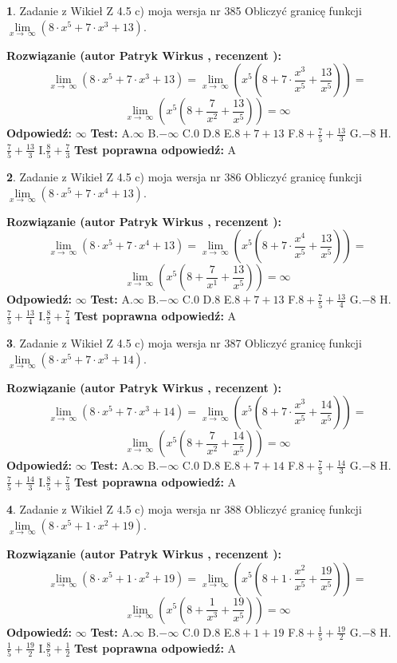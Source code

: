 \documentclass[12pt, a4paper]{article}
\theoremstyle{definition} %
\newtheorem{zad}{}
\newcommand{\zadStart}[1]{\begin{zad}#1\newline}
\newcommand{\zadStop}{\end{zad}}
\newcommand{\rozwStart}[2]{\noindent \textbf{Rozwiązanie (autor #1 , recenzent #2): }\newline}
\newcommand{\rozwStop}{\newline}
\newcommand{\odpStart}{\noindent \textbf{Odpowiedź:}\newline}
\newcommand{\odpStop}{\newline}
\newcommand{\testStart}{\noindent \textbf{Test:}\newline}
\newcommand{\testStop}{\newline}
\newcommand{\kluczStart}{\noindent \textbf{Test poprawna odpowiedź:}\newline}
\newcommand{\kluczStop}{\newline}
\begin{document}
\zadStart{Zadanie z Wikieł Z 4.5 c) moja wersja nr 385}
Obliczyć granicę funkcji  $\lim\limits_{x\to\ \infty}(8 \cdot x^{5}+7 \cdot x^{3}+13)$.
\zadStop
\rozwStart{Patryk Wirkus}{}
$$\lim\limits_{x\to\ \infty}(8 \cdot x^{5}+7 \cdot x^{3}+13) = \lim\limits_{x\to\ \infty}(x^{5}(8 +7 \cdot \frac{x^{3}}{x^{5}}+\frac{13}{x^{5}})) =$$ $$\lim\limits_{x\to\ \infty}(x^{5}(8 +\frac{7}{x^{2}}+\frac{13}{x^{5}})) =\infty$$
\rozwStop
\odpStart
$\infty$
\odpStop
\testStart
A.$\infty$ B.$-\infty$ C.$0$ D.$8$ E.$8 + 7 + 13$
F.$8+\frac{7}{5}+\frac{13}{3}$ G.$-8$
H.$\frac{7}{5}+\frac{13}{3}$
I.$\frac{8}{5}+\frac{7}{3}$
\testStop
\kluczStart
A
\kluczStop



\zadStart{Zadanie z Wikieł Z 4.5 c) moja wersja nr 386}
Obliczyć granicę funkcji  $\lim\limits_{x\to\ \infty}(8 \cdot x^{5}+7 \cdot x^{4}+13)$.
\zadStop
\rozwStart{Patryk Wirkus}{}
$$\lim\limits_{x\to\ \infty}(8 \cdot x^{5}+7 \cdot x^{4}+13) = \lim\limits_{x\to\ \infty}(x^{5}(8 +7 \cdot \frac{x^{4}}{x^{5}}+\frac{13}{x^{5}})) =$$ $$\lim\limits_{x\to\ \infty}(x^{5}(8 +\frac{7}{x^{1}}+\frac{13}{x^{5}})) =\infty$$
\rozwStop
\odpStart
$\infty$
\odpStop
\testStart
A.$\infty$ B.$-\infty$ C.$0$ D.$8$ E.$8 + 7 + 13$
F.$8+\frac{7}{5}+\frac{13}{4}$ G.$-8$
H.$\frac{7}{5}+\frac{13}{4}$
I.$\frac{8}{5}+\frac{7}{4}$
\testStop
\kluczStart
A
\kluczStop



\zadStart{Zadanie z Wikieł Z 4.5 c) moja wersja nr 387}
Obliczyć granicę funkcji  $\lim\limits_{x\to\ \infty}(8 \cdot x^{5}+7 \cdot x^{3}+14)$.
\zadStop
\rozwStart{Patryk Wirkus}{}
$$\lim\limits_{x\to\ \infty}(8 \cdot x^{5}+7 \cdot x^{3}+14) = \lim\limits_{x\to\ \infty}(x^{5}(8 +7 \cdot \frac{x^{3}}{x^{5}}+\frac{14}{x^{5}})) =$$ $$\lim\limits_{x\to\ \infty}(x^{5}(8 +\frac{7}{x^{2}}+\frac{14}{x^{5}})) =\infty$$
\rozwStop
\odpStart
$\infty$
\odpStop
\testStart
A.$\infty$ B.$-\infty$ C.$0$ D.$8$ E.$8 + 7 + 14$
F.$8+\frac{7}{5}+\frac{14}{3}$ G.$-8$
H.$\frac{7}{5}+\frac{14}{3}$
I.$\frac{8}{5}+\frac{7}{3}$
\testStop
\kluczStart
A
\kluczStop



\zadStart{Zadanie z Wikieł Z 4.5 c) moja wersja nr 388}
Obliczyć granicę funkcji  $\lim\limits_{x\to\ \infty}(8 \cdot x^{5}+1 \cdot x^{2}+19)$.
\zadStop
\rozwStart{Patryk Wirkus}{}
$$\lim\limits_{x\to\ \infty}(8 \cdot x^{5}+1 \cdot x^{2}+19) = \lim\limits_{x\to\ \infty}(x^{5}(8 +1 \cdot \frac{x^{2}}{x^{5}}+\frac{19}{x^{5}})) =$$ $$\lim\limits_{x\to\ \infty}(x^{5}(8 +\frac{1}{x^{3}}+\frac{19}{x^{5}})) =\infty$$
\rozwStop
\odpStart
$\infty$
\odpStop
\testStart
A.$\infty$ B.$-\infty$ C.$0$ D.$8$ E.$8 + 1 + 19$
F.$8+\frac{1}{5}+\frac{19}{2}$ G.$-8$
H.$\frac{1}{5}+\frac{19}{2}$
I.$\frac{8}{5}+\frac{1}{2}$
\testStop
\kluczStart
A
\kluczStop
\end{document}
